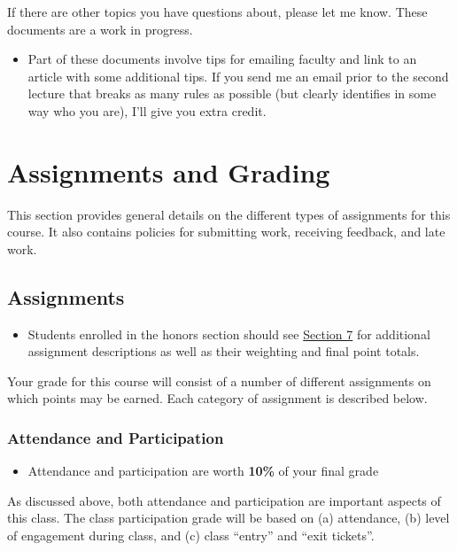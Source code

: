 \documentclass[]{book}
\newenvironment{rmdblock}[1]
  {\begin{shaded*}
  \begin{itemize}
  \renewcommand{\labelitemi}{
    \raisebox{-.7\height}[0pt][0pt]{
      {\setkeys{Gin}{width=3em,keepaspectratio}\texttt{[image: images/\#1]}}
    }
  }
  \item
  }
  {
  \end{itemize}
  \end{shaded*}
  }
\newenvironment{rmdnote}
  {\begin{rmdblock}{note}}
  {\end{rmdblock}}
\newenvironment{rmdtip}
  {\begin{rmdblock}{tip}}
  {\end{rmdblock}}
\newenvironment{rmdwarning}
  {\begin{rmdblock}{warning}}
  {\end{rmdblock}}
\begin{document}
If there are other topics you have questions about, please let me know. These documents are a work in progress.

\begin{rmdnote}
Part of these documents involve tips for emailing faculty and link to an
article with some additional tips. If you send me an email prior to the
second lecture that breaks as many rules as possible (but clearly
identifies in some way who you are), I'll give you extra credit.
\end{rmdnote}

\hypertarget{assignments-and-grading}{%
\chapter{Assignments and Grading}\label{assignments-and-grading}}

This section provides general details on the different types of assignments for this course. It also contains policies for submitting work, receiving feedback, and late work.

\hypertarget{assignments}{%
\section{Assignments}\label{assignments}}

\begin{rmdwarning}
Students enrolled in the honors section should see
\href{/syllabus/honors-overview.html}{Section 7} for additional
assignment descriptions as well as their weighting and final point
totals.
\end{rmdwarning}

Your grade for this course will consist of a number of different assignments on which points may be earned. Each category of assignment is described below.

\hypertarget{attendance-and-participation-1}{%
\subsection{Attendance and Participation}\label{attendance-and-participation-1}}

\begin{rmdtip}
Attendance and participation are worth \textbf{10\%} of your final grade
\end{rmdtip}

As discussed above, both attendance and participation are important aspects of this class. The class participation grade will be based on (a) attendance, (b) level of engagement during class, and (c) class ``entry'' and ``exit tickets''.
\end{document}
